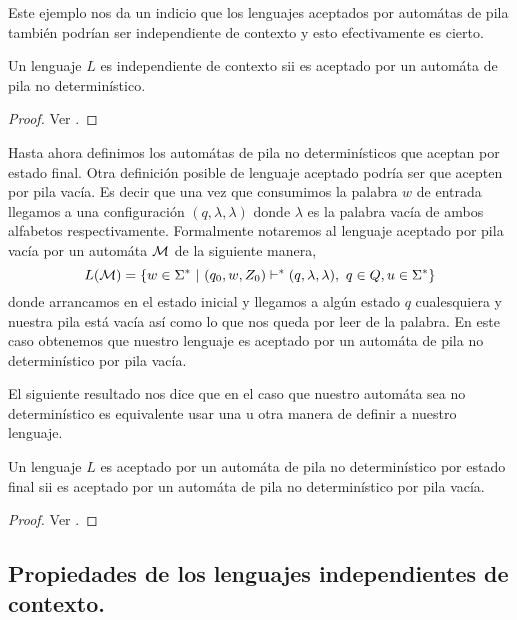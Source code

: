 \documentclass[tesis.tex]{subfiles}
\newcommand{\ic}{independiente de contexto }
\begin{document}
Este ejemplo nos da un indicio que los lenguajes aceptados por automátas de pila también podrían ser \ic y esto efectivamente es cierto.

\medskip

\begin{teo}\label{teo_ic_apnd}
Un lenguaje $L$ es independiente de contexto sii es aceptado por un automáta de pila no determinístico.
\end{teo}

\begin{proof}
	Ver \cite{hopcraft-ullman}.
\end{proof}
 


Hasta ahora definimos los automátas de pila no determinísticos que aceptan por estado final. Otra definición posible de lenguaje aceptado podría ser que acepten por pila vacía. 
Es decir que una vez que consumimos la palabra $w$ de entrada llegamos a una configuración $(q, \lambda, \lambda)$ donde $\lambda$ es la palabra vacía de ambos alfabetos respectivamente. Formalmente notaremos al lenguaje aceptado por pila vacía por un automáta $\cal M$
de la siguiente manera,
\begin{equation*}
	L({\cal M}) = \{ w \in \Sigma^* \ | \ (q_0,w,Z_0) \vdash^* (q, \lambda, \lambda), \ q \in Q, u \in \Sigma^*    \}
\end{equation*}
donde arrancamos en el estado inicial y llegamos a algún estado $q$ cualesquiera y nuestra pila está vacía así como lo que nos queda por leer de la palabra. 
En este caso obtenemos que nuestro lenguaje es aceptado por un automáta de pila no determinístico por pila vacía.


El siguiente resultado nos dice que en el caso que nuestro automáta sea no determinístico es equivalente usar una u otra manera de definir a nuestro lenguaje.

\medskip
\begin{teo}
Un lenguaje $L$ es aceptado por un automáta de pila no determinístico por estado final sii es aceptado por un automáta de pila no determinístico por pila vacía.
\end{teo}

\begin{proof}
	Ver \cite{hopcraft-ullman}.
\end{proof}


\subsection{Propiedades de los lenguajes independientes de contexto.}
\end{document}
